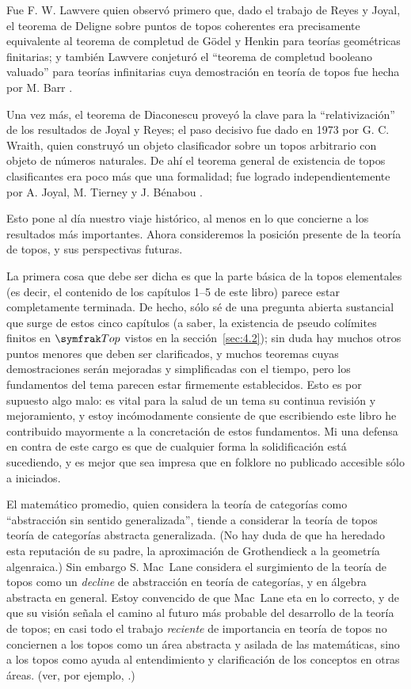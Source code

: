 Fue F. W. Lawvere \pend{[LB]} quien observó primero que, dado el trabajo de
Reyes y Joyal, el teorema de Deligne sobre puntos de topos coherentes era
precisamente equivalente al teorema de completud de Gödel y Henkin para teorías
geométricas finitarias; y también Lawvere conjeturó el \enquote{teorema de
completud booleano valuado} para teorías infinitarias cuya demostración en
teoría de topos fue hecha por M. Barr \pend{[4]}.

Una vez más, el teorema de Diaconescu proveyó la clave para la
\enquote{relativización} de los resultados de Joyal y Reyes; el paso decisivo
fue dado en 1973 por G. C. Wraith, quien construyó un objeto clasificador sobre
un topos arbitrario con objeto de números naturales. De ahí el teorema general
de existencia de topos clasificantes era poco más que una formalidad; fue
logrado independientemente por A. Joyal, M. Tierney \pend{[119]} y J. Bénabou
\pend{[8]}.

Esto pone al día nuestro viaje histórico, al menos en lo que concierne a los
resultados más importantes. Ahora consideremos la posición presente de la teoría
de topos, y sus perspectivas futuras.

La primera cosa que debe ser dicha es que la parte básica de la topos
elementales (es decir, el contenido de los capítulos 1--5 de este libro) parece
estar completamente terminada. De hecho, sólo sé de una pregunta abierta
sustancial que surge de estos cinco capítulos (a saber, la existencia de pseudo
colímites finitos en \(\cattop\) vistos en la sección~\ref{sec:4.2}); sin duda
hay muchos otros puntos menores que deben ser clarificados, y muchos teoremas
cuyas demostraciones serán mejoradas y simplificadas con el tiempo, pero los
fundamentos del tema parecen estar firmemente establecidos. Esto es por supuesto
algo malo: es vital para la salud de un tema su continua revisión y
mejoramiento, y estoy incómodamente consiente de que escribiendo este libro he
contribuido mayormente  a la concretación de estos fundamentos. Mi una defensa
en contra de este cargo es que de cualquier forma la solidificación está
sucediendo, y es mejor que sea impresa que en folklore no publicado accesible
sólo a iniciados.

El matemático promedio, quien considera la teoría de categorías como
\enquote{abstracción sin sentido generalizada}, tiende a considerar la teoría de
topos teoría de categorías abstracta generalizada. (No hay duda de que ha
heredado esta reputación de su padre, la aproximación de Grothendieck a la
geometría algenraica.) Sin embargo S. Mac~Lane \pend{[179]} considera el
surgimiento de la teoría de topos como un \textit{decline} de abstracción en
teoría de categorías, y en álgebra abstracta en general. Estoy convencido de que
Mac~Lane eta en lo correcto, y de que su visión señala el camino al futuro más
probable del desarrollo de la teoría de topos; en casi todo el trabajo
\textit{reciente} de importancia en teoría de topos no conciernen a los topos
como un área abstracta y asilada de las matemáticas, sino a los topos como ayuda
al entendimiento y clarificación de los conceptos en otras áreas. (ver, por
ejemplo, \pend{[36], [57], [63], [79], [88], [90], [112], [130]}.)

